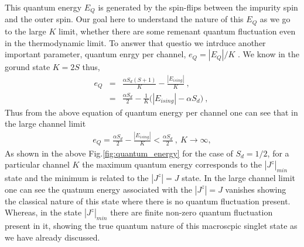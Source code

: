 \documentclass[reprint,prb,superscriptaddress]{revtex4-1}
\begin{document}
This quantum energy $E_Q$ is generated by the spin-flips between the impurity spin and the outer spin. Our goal here to understand the nature of this $E_Q$ as we go to the large $K$ limit, whether there are some remenant quantum fluctuation even in the thermodynamic limit. To answer that questio we intrduce another important parameter, quantum enrgy per channel, $e_Q=|E_Q|/K$ . We know in the gorund state $K=2S$ thus,
\begin{eqnarray}
e_Q &=& \frac{\alpha S_d(S+1)}{K} - \frac{|E_{ising}|}{K} ~,~\nonumber\\
&=& \frac{\alpha S_d}{2} -\frac{1}{K} \bigg(|E_{ising}| -\alpha S_d  \bigg)~,~
\end{eqnarray}
Thus from the above equation of quantum energy per channel one can see that in the large channel limit 
\begin{eqnarray}
e_Q = \frac{\alpha S_d}{2}- \frac{|E_{ising}|}{K} < \frac{\alpha S_d}{2}~,~K\rightarrow \infty, 
\end{eqnarray}
As shown in the above Fig.\ref{fig:quantum_energy} for the case of $S_d=1/2$, for a particular channel $K$ the maximum quantum energy corresponds to the $|J^z|_{min}$ state and the minimum is related to the $|J^z|=J$ state. In the large channel limit one can see the quatnum energy associated with the $|J^z|=J$ vanishes showing the classical nature of this state where there is no quantum fluctuation present. Whereas, in the state $|J^z|_{min}$ there are finite non-zero quantum fluctuation present in it, showing the true quantum nature of this macroscpic singlet state as we have already discussed.
\end{document}
